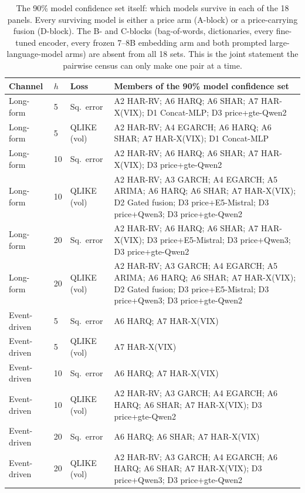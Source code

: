 \begin{table}[htbp]
\centering
\caption[Model-confidence-set membership, all 18 panels]{The 90\% model
confidence set \cite{hansen2011mcs} itself: which models survive in each of
the 18 panels. Every surviving model is either a price arm (A-block) or a
price-carrying fusion (D-block). The B- and C-blocks (bag-of-words,
dictionaries, every fine-tuned encoder, every frozen 7--8B embedding arm
and both prompted large-language-model arms) are absent from all 18
sets. This is the joint statement the pairwise census can only make one
pair at a time.}
\label{tab:app-mcs}
\singlespacing\footnotesize
\setlength{\tabcolsep}{4pt}
\begin{tabular}{@{}lllp{}@{}}
\toprule
Channel & $h$ & Loss & Members of the 90\% model confidence set \\
\midrule
Long-form & 5 & Sq.\ error & A2 HAR-RV; A6 HARQ; A6 SHAR; A7 HAR-X(VIX); D1 Concat-MLP; D3 price+gte-Qwen2 \\
Long-form & 5 & QLIKE (vol) & A2 HAR-RV; A4 EGARCH; A6 HARQ; A6 SHAR; A7 HAR-X(VIX); D1 Concat-MLP \\
Long-form & 10 & Sq.\ error & A2 HAR-RV; A6 HARQ; A6 SHAR; A7 HAR-X(VIX); D3 price+gte-Qwen2 \\
Long-form & 10 & QLIKE (vol) & A2 HAR-RV; A3 GARCH; A4 EGARCH; A5 ARIMA; A6 HARQ; A6 SHAR; A7 HAR-X(VIX); D2 Gated fusion; D3 price+E5-Mistral; D3 price+Qwen3; D3 price+gte-Qwen2 \\
Long-form & 20 & Sq.\ error & A2 HAR-RV; A6 HARQ; A6 SHAR; A7 HAR-X(VIX); D3 price+E5-Mistral; D3 price+Qwen3; D3 price+gte-Qwen2 \\
Long-form & 20 & QLIKE (vol) & A2 HAR-RV; A3 GARCH; A4 EGARCH; A5 ARIMA; A6 HARQ; A6 SHAR; A7 HAR-X(VIX); D2 Gated fusion; D3 price+E5-Mistral; D3 price+Qwen3; D3 price+gte-Qwen2 \\
\addlinespace
Event-driven & 5 & Sq.\ error & A6 HARQ; A7 HAR-X(VIX) \\
Event-driven & 5 & QLIKE (vol) & A7 HAR-X(VIX) \\
Event-driven & 10 & Sq.\ error & A6 HARQ; A7 HAR-X(VIX) \\
Event-driven & 10 & QLIKE (vol) & A2 HAR-RV; A3 GARCH; A4 EGARCH; A6 HARQ; A6 SHAR; A7 HAR-X(VIX); D3 price+gte-Qwen2 \\
Event-driven & 20 & Sq.\ error & A6 HARQ; A6 SHAR; A7 HAR-X(VIX) \\
Event-driven & 20 & QLIKE (vol) & A2 HAR-RV; A3 GARCH; A4 EGARCH; A6 HARQ; A6 SHAR; A7 HAR-X(VIX); D3 price+Qwen3; D3 price+gte-Qwen2 \\

\end{tabular}
\end{table}

